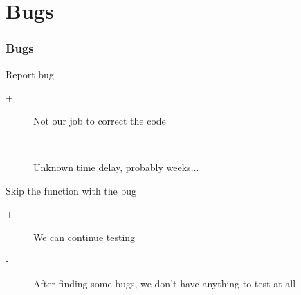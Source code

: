 \documentclass{beamer}
\begin{document}
\section{Bugs}

\begin{frame}
  \frametitle{Bugs}
  \begin{block}{Report bug}
    \begin{description}
      \item[+] Not our job to correct the code
      \item[-] Unknown time delay, probably weeks...
    \end{description}
  \end{block}

  \begin{block}{Skip the function with the bug}
    \begin{description}
      \item[+] We can continue testing
      \item[-] After finding some bugs, we don't have anything to test at all
    \end{description}
  \end{block}
\end{frame}

\end{document}
